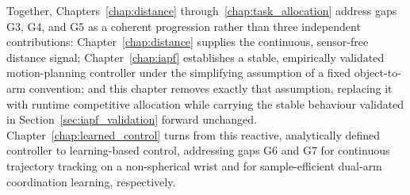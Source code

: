 Together, Chapters~\ref{chap:distance} through~\ref{chap:task_allocation} address gaps G3, G4, and
G5 as a coherent progression rather than three independent contributions: Chapter~\ref{chap:distance}
supplies the continuous, sensor-free distance signal; Chapter~\ref{chap:iapf} establishes a stable,
empirically validated motion-planning controller under the simplifying assumption of a fixed
object-to-arm convention; and this chapter removes exactly that assumption, replacing it with
runtime competitive allocation while carrying the stable behaviour validated in
Section~\ref{sec:iapf_validation} forward unchanged. Chapter~\ref{chap:learned_control} turns from
this reactive, analytically defined controller to learning-based control, addressing gaps G6 and G7
for continuous trajectory tracking on a non-spherical wrist and for sample-efficient dual-arm
coordination learning, respectively.
